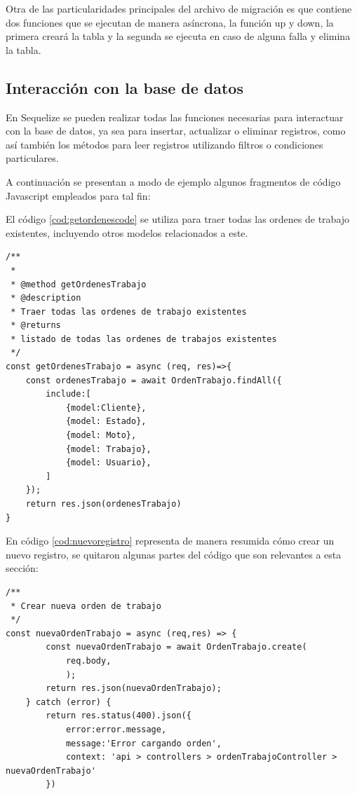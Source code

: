 Otra de las particularidades principales del archivo de migración es que contiene dos funciones que se ejecutan de manera asíncrona, la función up y down, la primera creará la tabla y la segunda se ejecuta en caso de alguna falla y elimina la tabla. 
  

\subsection{Interacción con la base de datos}
\label{subsec:interaccionbasededatos}

En Sequelize se pueden realizar todas las funciones necesarias para interactuar con la base de datos, ya sea para insertar, actualizar o eliminar registros, como así también los métodos para leer registros utilizando filtros o condiciones particulares.

A continuación se presentan a modo de ejemplo algunos fragmentos de código Javascript empleados para tal fin:

El código \ref{cod:getordenescode} se utiliza para traer todas las ordenes de trabajo existentes, incluyendo otros modelos relacionados a este.

\begin{lstlisting}[label=cod:getordenescode,caption= Código para traer datos en Sequelize.]
/**
 * 
 * @method getOrdenesTrabajo 
 * @description
 * Traer todas las ordenes de trabajo existentes
 * @returns
 * listado de todas las ordenes de trabajos existentes
 */
const getOrdenesTrabajo = async (req, res)=>{
    const ordenesTrabajo = await OrdenTrabajo.findAll({
        include:[
            {model:Cliente},
            {model: Estado},
            {model: Moto},
            {model: Trabajo},
            {model: Usuario},
        ]
    });
    return res.json(ordenesTrabajo)
}
\end{lstlisting}

En código \ref{cod:nuevoregistro} representa de manera resumida cómo crear un nuevo registro, se quitaron algunas partes del código que son relevantes a esta sección:

\begin{lstlisting}[label=cod:nuevoregistro,caption=Código para crear nuevo registro en la base de datos.]
/**
 * Crear nueva orden de trabajo
 */
const nuevaOrdenTrabajo = async (req,res) => {
        const nuevaOrdenTrabajo = await OrdenTrabajo.create(
            req.body, 
            );
        return res.json(nuevaOrdenTrabajo);     
    } catch (error) {
        return res.status(400).json({
            error:error.message, 
            message:'Error cargando orden',
            context: 'api > controllers > ordenTrabajoController > nuevaOrdenTrabajo'
        })  
\end{lstlisting}

